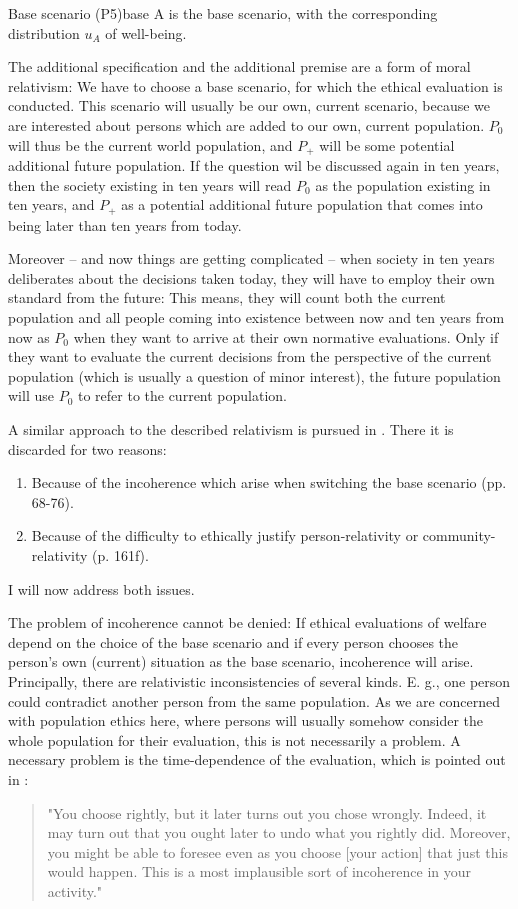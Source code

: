 \begin{Premise}{Base scenario (P5)}{base}
A is the base scenario, with the corresponding distribution $u_A$ of well-being.
\end{Premise}

The additional specification and the additional premise are a form of moral relativism: We have to choose a base scenario, for which the ethical evaluation is conducted. This scenario will usually be our own, current scenario, because we are interested about persons which are added to our own, current population. $P_0$ will thus be the current world population, and $P_+$ will be some potential additional future population. If the question wil be discussed again in ten years, then the society existing in ten years will read $P_0$ as the population existing in ten years, and $P_+$ as a potential additional future population that comes into being later than ten years from today. 

Moreover -- and now things are getting complicated -- when society in ten years deliberates about the decisions taken today, they will have to employ their own standard from the future: This means, they will count both the current population and all people coming into existence between now and ten years from now as $P_0$ when they want to arrive at their own normative evaluations. Only if they want to evaluate the current decisions from the perspective of the current population (which is usually a question of minor interest), the future population will use $P_0$ to refer to the current population. 

A similar approach to the described relativism is pursued in . There it is discarded for two reasons:
\begin{enumerate}
\item Because of the incoherence which arise when switching the base scenario (pp. 68-76). 
\item Because of the difficulty to ethically justify person-relativity or com\-mu\-ni\-ty-relativity (p. 161f). 
\end{enumerate}
I will now address both issues.  

The problem of incoherence cannot be denied: If ethical evaluations of welfare depend on the choice of the base scenario and if every person chooses the person's own (current) situation as the base scenario, incoherence will arise. Principally, there are relativistic inconsistencies of several kinds. E. g., one person could contradict another person from the same population. As we are concerned with population ethics here, where persons will usually somehow consider the whole population for their evaluation, this is not necessarily a problem. A necessary problem is the time-dependence of the evaluation, which is pointed out in : 
\begin{quote}
"You choose rightly, but it later turns out you chose wrongly. Indeed, it may turn out that you ought later to undo what you rightly did. Moreover, you might be able to foresee even as you choose [your action] that just this would happen. This is a most implausible sort of incoherence in your activity."
\end{quote}

